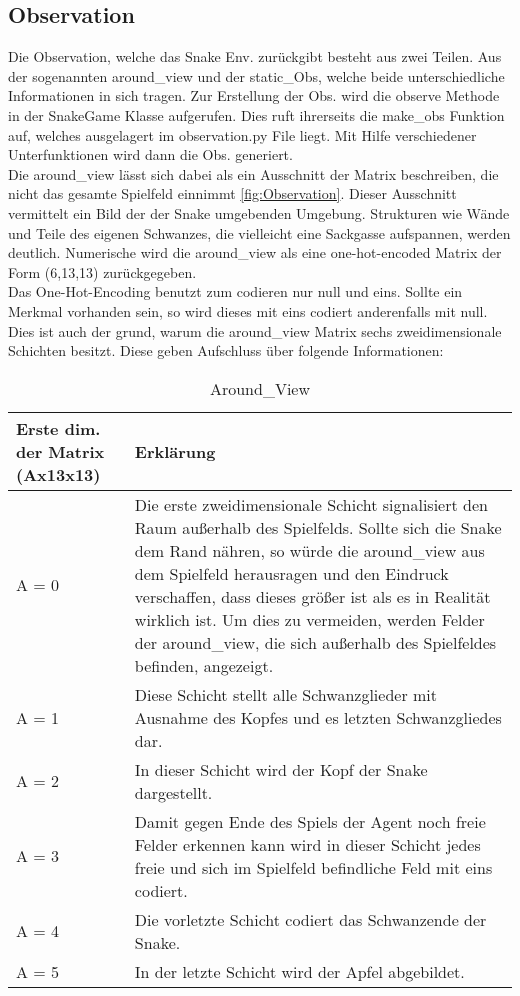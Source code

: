 \subsection{Observation}
Die Observation, welche das Snake Env. zurückgibt besteht aus zwei Teilen. Aus der sogenannten around\_view und der static\_Obs, welche beide unterschiedliche Informationen in sich tragen. Zur Erstellung der Obs. wird die observe Methode in der SnakeGame Klasse aufgerufen. Dies ruft ihrerseits die make\_obs Funktion auf, welches ausgelagert im observation.py File liegt. Mit Hilfe verschiedener Unterfunktionen wird dann die Obs. generiert.\\
Die around\_view lässt sich dabei als ein Ausschnitt der Matrix beschreiben, die nicht das gesamte Spielfeld einnimmt \ref{fig:Observation}. Dieser Ausschnitt vermittelt ein Bild der der Snake umgebenden Umgebung. Strukturen wie Wände und Teile des eigenen Schwanzes, die vielleicht eine Sackgasse aufspannen, werden deutlich. Numerische wird die around\_view als eine one-hot-encoded Matrix der Form (6,13,13) zurückgegeben.\\
Das One-Hot-Encoding benutzt zum codieren nur null und eins. Sollte ein Merkmal vorhanden sein, so wird dieses mit eins codiert anderenfalls mit null.\\
Dies ist auch der grund, warum die around\_view Matrix sechs zweidimensionale Schichten besitzt. Diese geben Aufschluss über folgende Informationen:
\begin{longtable}[h]{|p{4cm}|p{\linewidth - 5cm}|}
	\caption{Around\_View}
	\label{tab:around_view} 
	\endfirsthead
	\endhead
	\hline
	Erste dim. der Matrix (Ax13x13) & Erklärung \\
	\hline
	A = 0 & Die erste zweidimensionale Schicht signalisiert den Raum außerhalb des Spielfelds. Sollte sich die Snake dem Rand nähren, so würde die around\_view aus dem Spielfeld herausragen und den Eindruck verschaffen, dass dieses größer ist als es in Realität wirklich ist. Um dies zu vermeiden, werden Felder der around\_view, die sich außerhalb des Spielfeldes befinden, angezeigt.\\
	\hline
	A = 1 & Diese Schicht stellt alle Schwanzglieder mit Ausnahme des Kopfes und es letzten Schwanzgliedes dar. \\
	\hline
	A = 2 & In dieser Schicht wird der Kopf der Snake dargestellt. \\
	\hline
	A = 3 & Damit gegen Ende des Spiels der Agent noch freie Felder erkennen kann wird in dieser Schicht jedes freie und sich im Spielfeld befindliche Feld mit eins codiert. \\
	\hline
	A = 4 & Die vorletzte Schicht codiert das Schwanzende der Snake. \\
	\hline
	A = 5 & In der letzte Schicht wird der Apfel abgebildet. \\
	\hline
\end{longtable}
